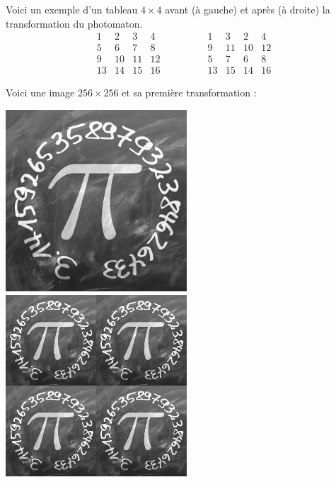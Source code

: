 \documentclass[11pt,class=report,crop=false]{standalone}
\begin{document}
\begin{cours}
\medskip

Voici un exemple d'un tableau $4\times 4$ avant (à gauche) et après (à droite) la transformation du photomaton. 
$$\begin{array}{cccc} 
  1& 2& 3& 4\\ 
  5& 6& 7& 8\\  
  9&10&11&12\\  
 13&14&15&16  
\end{array}\qquad\qquad  
\begin{array}{cccc} 
  1& 3& 2& 4\\  
  9&11&10&12\\  
  5& 7& 6& 8\\  
 13&15&14&16
\end{array}$$

Voici une image $256 \times 256$ et sa première transformation :

\begin{center}
\includegraphics[scale=0.4]{images_fiche/pi_gimp_new_photo_0.png}\qquad\qquad
\includegraphics[scale=0.4]{images_fiche/pi_gimp_new_photo_1.png}
\end{center}


\end{cours}
\end{document}
